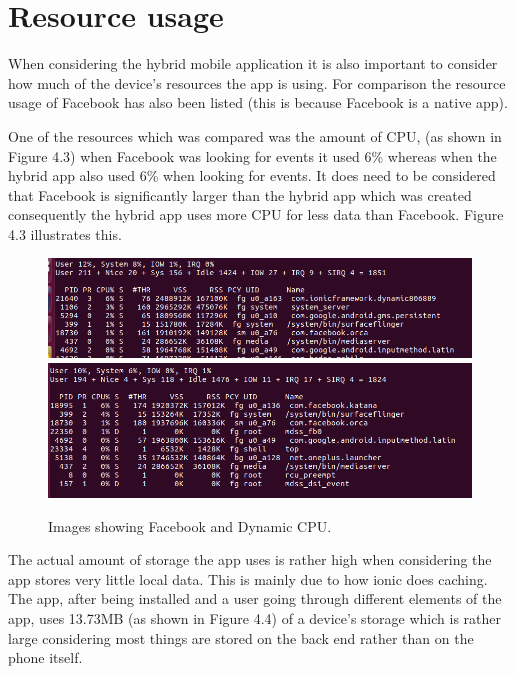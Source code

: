  \section{Resource usage}
 When considering the hybrid mobile application it is also important to consider how much of the device's resources the app is using. For comparison the resource usage of Facebook has also been listed (this is because Facebook is a native app).

 One of the resources which was compared was the amount of CPU, (as shown in Figure 4.3) when Facebook was looking for events it used 6\% whereas when the hybrid app also used 6\% when looking for events. It does need to be considered that Facebook is significantly larger than the hybrid app which was created consequently the hybrid app uses more CPU for less data than Facebook. Figure 4.3 illustrates this.

\begin{figure}[H]
\begin{center}
\includegraphics[scale=0.45]{images/ram2}
\includegraphics[scale=0.45]{images/ram3}
\caption{Images showing Facebook and Dynamic CPU.}
\end{center}
\end{figure}

The actual amount of storage the app uses is rather high when considering the app stores very little local data. This is mainly due to how ionic does caching. The app, after being installed and a user going through different elements of the app, uses 13.73MB (as shown in Figure 4.4) of a device's storage which is rather large considering most things are stored on the back end rather than on the phone itself. 

